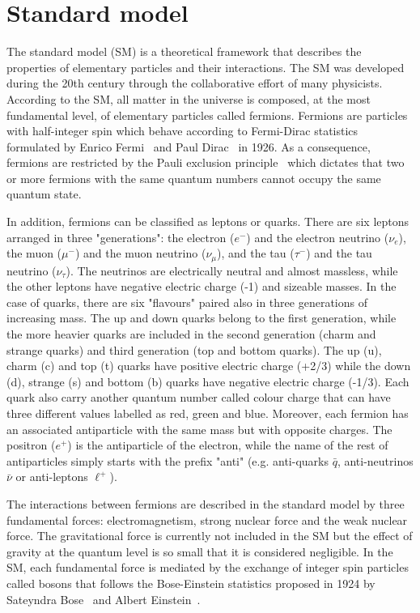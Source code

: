 \section{Standard model}\label{sec:Introduction_SM}

The standard model (SM) is a theoretical framework that describes the properties of elementary particles and their interactions. The SM was developed during the 20th century through the collaborative effort of many physicists. According to the SM, all matter in the universe is composed, at the most fundamental level, of elementary particles called fermions. Fermions are particles with half-integer spin which behave according to Fermi-Dirac statistics formulated by Enrico Fermi~\cite{FermiDiracStatistics_1} and Paul Dirac~\cite{FermiDiracStatistics_2} in 1926. As a consequence, fermions are restricted by the Pauli exclusion principle~\cite{PauliExclusion} which dictates that two or more fermions with the same quantum numbers cannot occupy the same quantum state.

In addition, fermions can be classified as leptons or quarks. There are six leptons arranged in three "generations": the electron ($e^{-}$) and the electron neutrino ($\nu_{e}$), the muon ($\mu^{-}$) and the muon neutrino ($\nu_{\mu}$), and the tau ($\tau^{-}$) and the tau neutrino ($\nu_{\tau}$). The neutrinos are electrically neutral and almost massless, while the other leptons have negative electric charge (-1) and sizeable masses. In the case of quarks, there are six "flavours" paired also in three generations of increasing mass. The up and down quarks belong to the first generation, while the more heavier quarks are included in the second generation (charm and strange quarks) and third generation (top and bottom quarks). The up (u), charm (c) and top (t) quarks have positive electric charge (+2/3) while the down (d), strange (s) and bottom (b) quarks have negative electric charge (-1/3). Each quark also carry another quantum number called colour charge that can have three different values labelled as red, green and blue. Moreover, each fermion has an associated antiparticle with the same mass but with opposite charges. The positron ($e^{+}$) is the antiparticle of the electron, while the name of the rest of antiparticles simply starts with the prefix "anti" (e.g. anti-quarks $\bar{q}$, anti-neutrinos $\bar{\nu}$ or anti-leptons $\ell^{+}$).

The interactions between fermions are described in the standard model by three fundamental forces: electromagnetism, strong nuclear force and the weak nuclear force. The gravitational force is currently not included in the SM but the effect of gravity at the quantum level is so small that it is considered negligible. In the SM, each fundamental force is mediated by the exchange of integer spin particles called bosons that follows the Bose-Einstein statistics proposed in 1924 by Sateyndra Bose~\cite{BoseEinsteinStatistics_1} and Albert Einstein~\cite{BoseEinsteinStatistics_2}.

